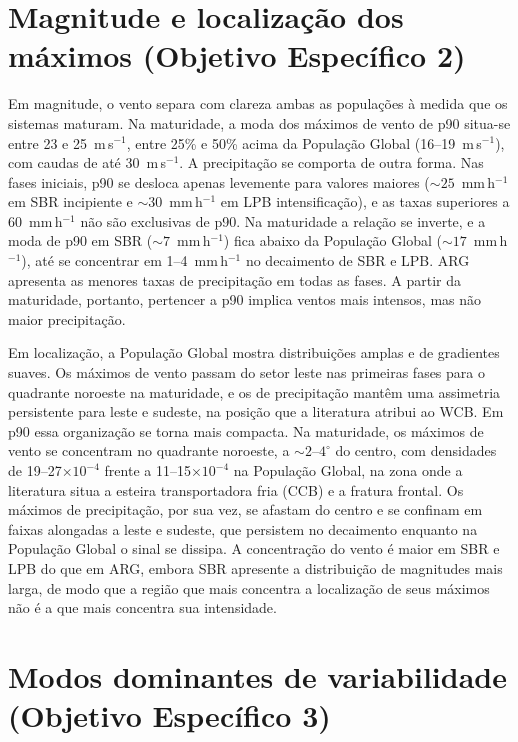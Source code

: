 \section{Magnitude e localização dos máximos (Objetivo Específico 2)}

Em magnitude, o vento separa com clareza ambas as populações à medida que os sistemas maturam. Na maturidade, a moda dos máximos de vento de p90 situa-se entre 23 e 25~m\,s$^{-1}$, entre 25\% e 50\% acima da População Global (16--19~m\,s$^{-1}$), com caudas de até 30~m\,s$^{-1}$. A precipitação se comporta de outra forma. Nas fases iniciais, p90 se desloca apenas levemente para valores maiores (${\sim}25$~mm\,h$^{-1}$ em SBR incipiente e ${\sim}30$~mm\,h$^{-1}$ em LPB intensificação), e as taxas superiores a 60~mm\,h$^{-1}$ não são exclusivas de p90. Na maturidade a relação se inverte, e a moda de p90 em SBR (${\sim}7$~mm\,h$^{-1}$) fica abaixo da População Global (${\sim}17$~mm\,h$^{-1}$), até se concentrar em 1--4~mm\,h$^{-1}$ no decaimento de SBR e LPB. ARG apresenta as menores taxas de precipitação em todas as fases. A partir da maturidade, portanto, pertencer a p90 implica ventos mais intensos, mas não maior precipitação.

Em localização, a População Global mostra distribuições amplas e de gradientes suaves. Os máximos de vento passam do setor leste nas primeiras fases para o quadrante noroeste na maturidade, e os de precipitação mantêm uma assimetria persistente para leste e sudeste, na posição que a literatura atribui ao WCB. Em p90 essa organização se torna mais compacta. Na maturidade, os máximos de vento se concentram no quadrante noroeste, a ${\sim}2$--$4^{\circ}$ do centro, com densidades de 19--27$\times10^{-4}$ frente a 11--15$\times10^{-4}$ na População Global, na zona onde a literatura situa a esteira transportadora fria (CCB) e a fratura frontal. Os máximos de precipitação, por sua vez, se afastam do centro e se confinam em faixas alongadas a leste e sudeste, que persistem no decaimento enquanto na População Global o sinal se dissipa. A concentração do vento é maior em SBR e LPB do que em ARG, embora SBR apresente a distribuição de magnitudes mais larga, de modo que a região que mais concentra a localização de seus máximos não é a que mais concentra sua intensidade.

\section{Modos dominantes de variabilidade (Objetivo Específico 3)}


